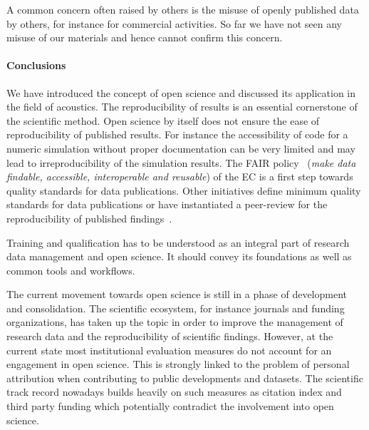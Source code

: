 \documentclass[a4paper, 10pt, twocolumn]{article}
\begin{document}
A common concern often raised by others is the misuse of openly published data by others, 
for instance for commercial activities. So far we have not seen any misuse of our
materials and hence cannot confirm this concern.

\paragraph*{Conclusions}

We have introduced the concept of open science and discussed its application in the
field of acoustics. The reproducibility of results is an essential cornerstone of
the scientific method. Open science by itself does not ensure the ease of reproducibility of
published results. For instance the accessibility of code for a numeric simulation without
proper documentation can be very limited and may lead to irreproducibility of the simulation results. The FAIR policy~\cite{H2020_FAIR:ERC} (\emph{make data findable, accessible, interoperable and reusable}) of the EC is a first step towards quality standards for 
data publications. Other initiatives define minimum quality standards for data publications 
or have instantiated a peer-review for the reproducibility of published findings~\cite{}.  

Training and qualification has to be understood as an integral part of research data management and open science. It should convey its foundations as well as common tools and workflows.

The current movement towards open science is still in a phase of development and 
consolidation. The scientific ecosystem, for instance journals and funding organizations, 
has taken up the topic in order to improve the management of research data and the reproducibility of scientific findings. However, at the current state most institutional evaluation measures do not account for an engagement in open science. This is strongly 
linked to the problem of personal attribution when contributing to public developments and datasets. The scientific track record nowadays builds heavily on such measures as 
citation index and third party funding which potentially contradict the involvement into 
open science.


{


}
\end{document}
